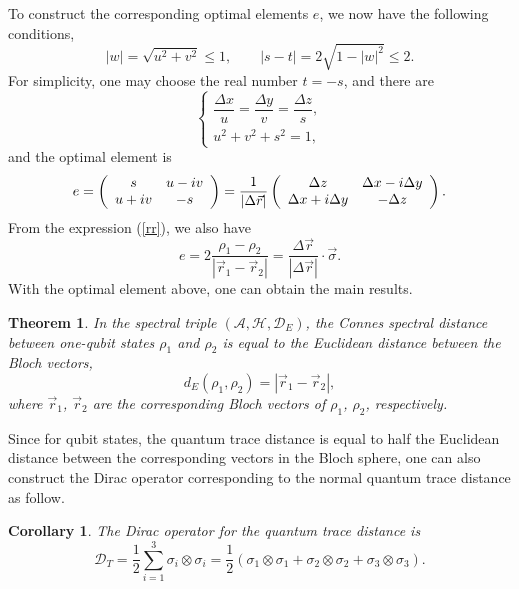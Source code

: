 \documentclass[a4paper,12pt]{article}
\newtheorem{theorem}{Theorem}
\newtheorem{corollary}{Corollary}
\begin{document}
To construct the corresponding optimal elements $e$, we now have the following conditions,
\begin{equation}
	|w|=\sqrt{u^{2}+v^2}\leqslant 1, \qquad |s-t|=2\sqrt{1- |w|^2}\leqslant 2.
\end{equation}
For simplicity, one may choose the real number $t=-s$, and there are
\begin{equation}
	\left\{
	\begin{array}{ll}
		\dfrac{\Delta x}{u}=\dfrac{\Delta y}{v}=\dfrac{\Delta z}{s},\\[0.8em]
		u^{2}+v^2 +s^{2}=1,
	\end{array}\right.
\end{equation}
and the optimal element is
\begin{equation}
	e=\left(
	\begin{array}{cc}
		s & u-{\rm i}v \\
		u+{\rm i}v & -s \end{array}
	\right)=\frac{1}{|\Delta\vec{r}|}\left(
	\begin{array}{cc}
		\Delta z & \Delta x-{\rm i}\Delta y \\
		\Delta x+{\rm i}\Delta y & -\Delta z \end{array}
	\right).
\end{equation}
From the expression (\ref{rr}), we also have
\begin{equation}
	e=2\frac{\rho_1-\rho_2}{|\vec{r}_1-\vec{r}_2|}=\frac{\Delta\vec{r}}{|\Delta\vec{r}|}\cdot \vec{\sigma}.
\end{equation}
With the optimal element above, one can obtain the main results.
\begin{theorem}
	In the spectral triple $(\mathcal{A},\mathcal{H},\mathcal{D}_E)$, the Connes spectral distance between one-qubit states $\rho_1$ and $\rho_2$ is equal to the Euclidean distance between the Bloch vectors, 
	\begin{equation}
		d_E(\rho_1, \rho_2) =|\vec{r}_1-\vec{r}_2|,
	\end{equation}
	where $\vec{r}_1$, $\vec{r}_2$ are the corresponding Bloch vectors of $\rho_1$, $\rho_2$, respectively.
\end{theorem}


Since for qubit states, the quantum trace distance is equal to half the Euclidean distance between the corresponding vectors in the Bloch sphere, one can also construct the Dirac operator corresponding to the normal quantum trace distance as follow.
\begin{corollary}
	The Dirac operator for the quantum trace distance is
	\begin{equation}
		\mathcal{D}_{T} = \frac{1}{2} \sum_{i=1}^{3} \sigma_i\otimes \sigma _{i}  = \frac{1}{2} \left ( \sigma_1\otimes \sigma _{1}  + \sigma_2\otimes \sigma _{2}  + \sigma_3\otimes \sigma _{3} \right ). 
	\end{equation}
\end{corollary}
\end{document}
